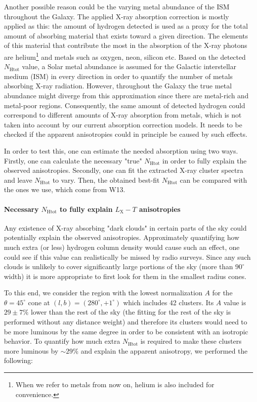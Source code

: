 \documentclass{aa}   %
\begin{document}
Another possible reason could be the varying metal abundance of the ISM throughout the Galaxy. The applied X-ray absorption correction is mostly applied as this: the amount of hydrogen detected is used as a proxy for the total amount of absorbing material that exists toward a given direction. The elements of this material that contribute the most in the absorption of the X-ray photons are helium\footnote{When we refer to metals from now on, helium is also included for convenience.} and metals such as oxygen, neon, silicon etc. Based on the detected  $N_{\text{Htot}}$ value, a Solar metal abundance is assumed for the Galactic interstellar medium (ISM) in every direction in order to quantify the number of metals absorbing X-ray radiation. However, throughout the Galaxy the true metal abundance might diverge from this approximation since there are metal-rich and metal-poor regions. Consequently, the same amount of detected hydrogen could correspond to different amounts of X-ray absorption from metals, which is not taken into account by our current absorption correction models. It needs to be checked if the apparent anisotropies could in principle be caused by such effects.

In order to test this, one can estimate the needed absorption using two ways. Firstly, one can calculate the necessary "true" $N_{\text{Htot}}$ in order to fully explain the observed anisotropies. Secondly, one can fit the extracted X-ray cluster spectra and leave $N_{\text{Htot}}$ to vary. Then, the obtained best-fit $N_{\text{Htot}}$ can be compared with the ones we use, which come from W13.

\paragraph{Necessary $N_{\text{Htot}}$ to fully explain $L_{\text{X}}-T$ anisotropies} \label{extra_nh}

Any existence of X-ray absorbing "dark clouds" in certain parts of the sky could potentially explain the observed anisotropies. Approximately quantifying how much extra (or less) hydrogen column density would cause such an effect, one could see if this value can realistically be missed by radio surveys. Since any such clouds is unlikely to cover significantly large portions of the sky (more than $90^{\circ}$ width) it is more appropriate to first look for them in the smallest radius cones. 

To this end, we consider the region with the lowest normalization $A$ for the $\theta=45^{\circ}$ cone at $(l,b)=(280^{\circ}, +1^{\circ})$ which includes 42 clusters. Its $A$ value is $29\pm 7 \%$ lower than the rest of the sky (the fitting for the rest of the sky is performed without any distance weight) and therefore its clusters would need to be more luminous by the same degree in order to be consistent with an isotropic behavior. To quantify how much extra $N_{\text{Htot}}$ is required to make these clusters more luminous by $\sim29$\% and explain the apparent anisotropy, we performed the following: 
\end{document}
